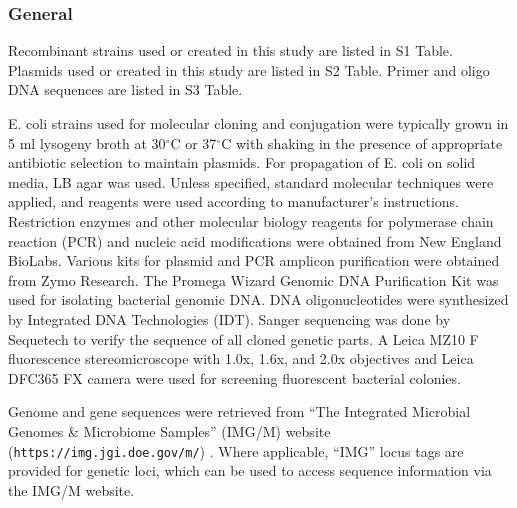 {{{{{{{\subsubsection{General}
Recombinant strains used or created in this study are listed in S1 Table. Plasmids used or created in this study are listed in S2 Table. Primer and oligo DNA sequences are listed in S3 Table. 

E. coli strains used for molecular cloning and conjugation were typically grown in 5 ml lysogeny broth at 30$^\circ$C or 37$^\circ$C with shaking in the presence of appropriate antibiotic selection to maintain plasmids. For propagation of E. coli on solid media, LB agar was used. Unless specified, standard molecular techniques were applied, and reagents were used according to manufacturer's instructions. Restriction enzymes and other molecular biology reagents for polymerase chain reaction (PCR) and nucleic acid modifications were obtained from New England BioLabs. Various kits for plasmid and PCR amplicon purification were obtained from Zymo Research. The Promega Wizard Genomic DNA Purification Kit was used for isolating bacterial genomic DNA. DNA oligonucleotides were synthesized by Integrated DNA Technologies (IDT). Sanger sequencing was done by Sequetech to verify the sequence of all cloned genetic parts. A Leica MZ10 F fluorescence stereomicroscope with 1.0x, 1.6x, and 2.0x objectives and Leica DFC365 FX camera were used for screening fluorescent bacterial colonies. 

Genome and gene sequences were retrieved from ``The Integrated Microbial Genomes \& Microbiome Samples'' (IMG/M) website (\texttt{https://img.jgi.doe.gov/m/}) \cite{chen_imgm_2017}. Where applicable, ``IMG'' locus tags are provided for genetic loci, which can be used to access sequence information via the IMG/M website. 

}}}}}}}
